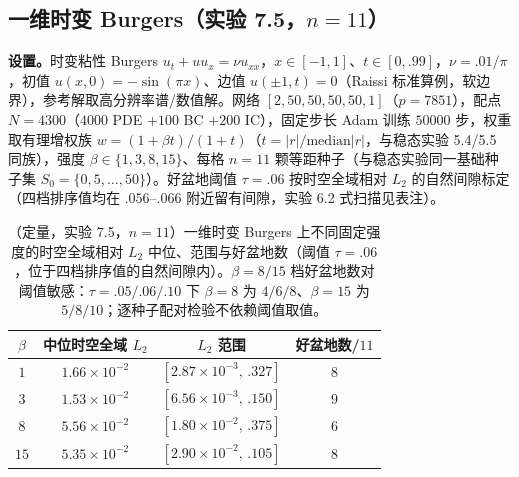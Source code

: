 \documentclass[fontset=windows,11pt]{ctexart}
\numberwithin{equation}{section}
\begin{document}
\subsection{一维时变 Burgers（实验 7.5，$n=11$）}\label{sec:d1}

\textbf{设置。}时变粘性 Burgers $u_t+uu_x=\nu u_{xx}$，$x\in[-1,1]$、$t\in[0,.99]$，$\nu=.01/\pi$，初值 $u(x,0)=-\sin(\pi x)$、边值 $u(\pm1,t)=0$（Raissi 标准算例，软边界），参考解取高分辨率谱/数值解。网络 $[2,50,50,50,50,1]$（$p=7851$），配点 $N=4300$（$4000$ PDE $+100$ BC $+200$ IC），固定步长 Adam 训练 $50000$ 步，权重取有理增权族 $w=(1+\beta t)/(1+t)$（$t=|r|/\mathrm{median}|r|$，与稳态实验 5.4/5.5 同族），强度 $\beta\in\{1,3,8,15\}$、每格 $n=11$ 颗等距种子（与稳态实验同一基础种子集 $S_0=\{0,5,\dots,50\}$）。好盆地阈值 $\tau=.06$ 按时空全域相对 $L_2$ 的自然间隙标定（四档排序值均在 $.056$--$.066$ 附近留有间隙，实验 6.2 式扫描见表注）。

\begin{table}[ht]\centering\small\renewcommand{\arraystretch}{1.2}
\begin{tabular}{cccc}
\toprule
$\beta$ & 中位时空全域 $L_2$ & $L_2$ 范围 & 好盆地数/$11$\\
\midrule
$1$  & $1.66\times10^{-2}$ & $[2.87\times10^{-3},\,.327]$ & $8$\\
$3$  & $1.53\times10^{-2}$ & $[6.56\times10^{-3},\,.150]$ & $9$\\
$8$  & $5.56\times10^{-2}$ & $[1.80\times10^{-2},\,.375]$ & $6$\\
$15$ & $5.35\times10^{-2}$ & $[2.90\times10^{-2},\,.105]$ & $8$\\
\bottomrule
\end{tabular}
\caption{（定量，实验 7.5，$n=11$）一维时变 Burgers 上不同固定强度的时空全域相对 $L_2$ 中位、范围与好盆地数（阈值 $\tau=.06$，位于四档排序值的自然间隙内）。$\beta=8/15$ 档好盆地数对阈值敏感：$\tau=.05/.06/.10$ 下 $\beta=8$ 为 $4/6/8$、$\beta=15$ 为 $5/8/10$；逐种子配对检验不依赖阈值取值。}\label{tab:d1beta}
\end{table}
\end{document}

